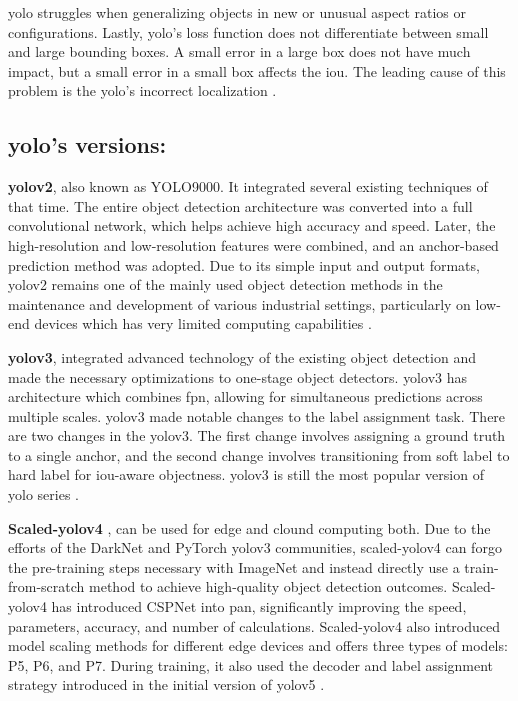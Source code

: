 \gls{yolo} struggles when generalizing objects in new or unusual aspect ratios or configurations. Lastly, \gls{yolo}'s loss function does not differentiate between small and large bounding boxes. A small error in a large box does not have much impact, but a small error in a small box affects the \gls{iou}. The leading cause of this problem is the \gls{yolo}'s incorrect localization \cite{redmon2016you}.

\subsection*{\gls{yolo}'s versions: }

\textbf{\gls{yolo}v2}\cite{redmon2017yolo9000}, also known as YOLO9000. It integrated several existing techniques of that time. The entire object detection architecture was converted into a full convolutional network, which helps achieve high accuracy and speed. Later, the high-resolution and low-resolution features were combined, and an anchor-based prediction method was adopted. Due to its simple input and output formats, \gls{yolo}v2 remains one of the mainly used object detection methods in the maintenance and development of various industrial settings, particularly on low-end devices which has very limited computing capabilities \cite{wang2024yolov1}.

\textbf{\gls{yolo}v3}\cite{redmon2018yolov3}, integrated advanced technology of the existing object detection and made the necessary optimizations to one-stage object detectors. \gls{yolo}v3 has architecture which combines \gls{fpn}, allowing for simultaneous predictions across multiple scales. \gls{yolo}v3 made notable changes to the label assignment task. There are two changes in the \gls{yolo}v3. The first change involves assigning a ground truth to a single anchor, and the second change involves transitioning from soft label to hard label for \gls{iou}-aware objectness. \gls{yolo}v3 is still the most popular version of \gls{yolo} series \cite{wang2024yolov1}.

\textbf{Scaled-\gls{yolo}v4} \cite{wang2021scaled}, can be used for edge and clound computing both. Due to the efforts of the DarkNet and PyTorch \gls{yolo}v3 communities, scaled-\gls{yolo}v4 can forgo the pre-training steps necessary with ImageNet and instead directly use a train-from-scratch method to achieve high-quality object detection outcomes. Scaled-\gls{yolo}v4 has introduced CSPNet into \gls{pan}, significantly improving the speed, parameters, accuracy, and number of calculations. Scaled-\gls{yolo}v4 also introduced model scaling methods for different edge devices and offers three types of models: P5, P6, and P7. During training, it also used the decoder and label assignment strategy introduced in the initial version of \gls{yolo}v5 \cite{wang2024yolov1}.

